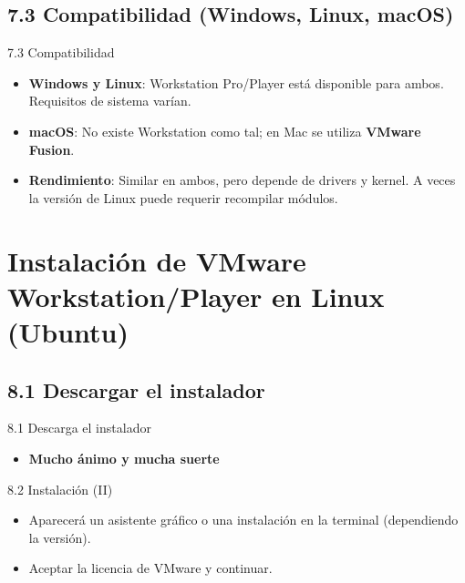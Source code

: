 \documentclass{beamer}
\begin{document}
\subsection{7.3 Compatibilidad (Windows, Linux, macOS)}
\begin{frame}{7.3 Compatibilidad}
    \begin{itemize}
        \item \textbf{Windows y Linux}: Workstation Pro/Player está disponible para ambos. Requisitos de sistema varían.
        \item \textbf{macOS}: No existe Workstation como tal; en Mac se utiliza \textbf{VMware Fusion}.  
        \item \textbf{Rendimiento}: Similar en ambos, pero depende de drivers y kernel. A veces la versión de Linux puede requerir recompilar módulos.
    \end{itemize}
\end{frame}

\section{Instalación de VMware Workstation/Player en Linux (Ubuntu)}

\subsection{8.1 Descargar el instalador}
\begin{frame}{8.1 Descarga el instalador}
    \begin{itemize}
        \item \textbf{Mucho ánimo y mucha suerte}
    \end{itemize}
\end{frame}


\begin{frame}{8.2 Instalación (II)}
    \begin{itemize}
        \item Aparecerá un asistente gráfico o una instalación en la terminal (dependiendo la versión).
        \item Aceptar la licencia de VMware y continuar.
    \end{itemize}
\end{frame}
\end{document}

